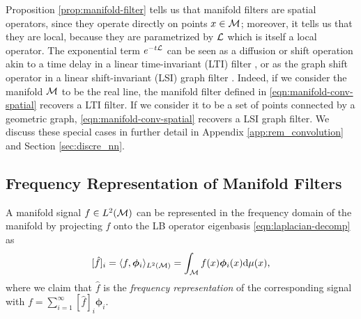 Proposition \ref{prop:manifold-filter} tells us that manifold filters are spatial operators, since they operate directly on points $x \in {\ensuremath{\mathcal M}}$; moreover, it tells us that they are local, because they are parametrized by ${\mathcal L}$ which is itself a local operator. The exponential term $e^{-t{\mathcal L}}$ can be seen as a diffusion or shift operation akin to a time delay in a linear time-invariant (LTI) filter \cite{oppenheim1997signals}, or as the graph shift operator in a linear shift-invariant (LSI) graph filter \cite{gama2020graphs}. Indeed, if we consider the manifold ${\mathcal M}$ to be the real line, the manifold filter defined in \eqref{eqn:manifold-conv-spatial} recovers a LTI filter. If we consider it to be a set of points connected by a geometric graph, \eqref{eqn:manifold-conv-spatial} recovers a LSI graph filter. We discuss these special cases in further detail in Appendix \ref{app:rem_convolution} and Section \ref{sec:discre_nn}.




\subsection{Frequency Representation of Manifold Filters}\label{sec_spectral_representation}

A manifold signal $f\in L^2({\mathcal M})$ can be represented in the frequency domain of the manifold by projecting $f$ onto the LB operator eigenbasis \eqref{eqn:laplacian-decomp} as
%
\begin{equation}\label{eqn:f-decomp}
[\hat{f}]_i= \langle f, \bm\phi_i \rangle_{L^2({\mathcal M})} = \int_{\mathcal M} f(x) \bm\phi_i(x) \text{d} \mu(x) \text{,}
\end{equation} 
where we claim that $\hat{f}$ is the \textit{frequency representation} of the corresponding signal with $f=\sum_{i=1}^\infty [\hat{f}]_i \bm\phi_i$.

